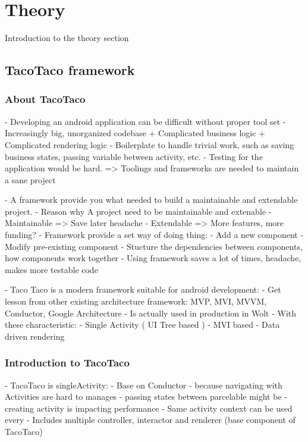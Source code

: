\chapter{Theory}

Introduction to the theory section

\section{TacoTaco framework}

\subsection{About TacoTaco}

- Developing an android application can be difficult without proper tool set
    - Increasingly big, unorganized codebase
        + Complicated business logic
        + Complicated rendering logic
    - Boilerplate to handle trivial work, such as saving business states, passing variable between activity, etc.
    - Testing for the application would be hard.
    => Toolings and frameworks are needed to maintain a sane project\

- A framework provide you what needed to build a maintainable and extendable project.
    - Reason why A project need to be maintainable and extenable
        - Maintainable => Save later headache
        - Extendable => More features, more funding?
    - Framework provide a set way of doing thing:
        - Add a new component
        - Modify pre-existing component
        - Stucture the dependencies between components, how  components work together
    - Using framework saves a lot of times, headache, makes more testable code
    
- Taco Taco is a modern framework suitable for android development:
    - Get lesson from other existing architecture framework: MVP, MVI, MVVM, Conductor, Google Architecture
    - Is actually used in production in Wolt
    - With these characteristic:
        - Single Activity ( UI Tree based )
        - MVI based
        - Data driven rendering

\subsection{Introduction to TacoTaco}

- TacoTaco is singleActivity:
    - Base on Conductor
    - because navigating with Activities are hard to manages
        - passing states between parcelable might be
        - creating activity is impacting performance
        - Same activity context can be used every
    - Includes multiple controller, interactor and renderer (base component of TacoTaco)
        
